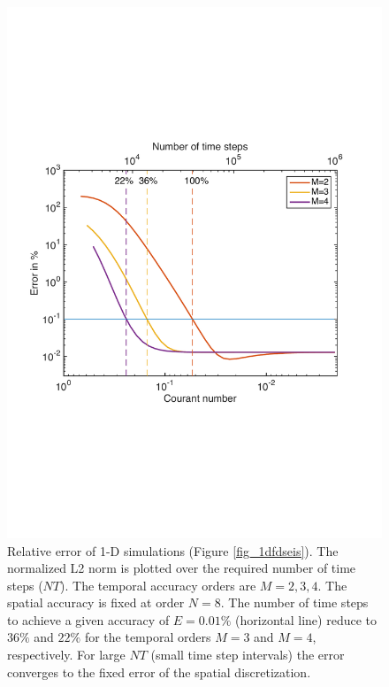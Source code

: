 \documentclass[11pt,onecolumn,oneside]{article}
\begin{document}
\begin{figure}[h]
\begin{center}
\includegraphics[scale=0.7]{eps/error_1D_courant}
\caption{Relative error of 1-D simulations (Figure \ref{fig_1dfdseis}). 
The normalized L2 norm is plotted over the required number of time steps ($NT$). The temporal accuracy orders are $M=2,3,4$. The spatial accuracy is fixed at order $N=8$. 
The number of time steps to achieve a given accuracy of $E=0.01\%$ (horizontal line) reduce to $36\%$ and $22\%$ for the temporal orders $M=3$ and $M=4$, respectively. 
For large $NT$ (small time step intervals) the error converges to the fixed error of the spatial discretization. }
\label{fig_L2}
\end{center}
\end{figure}
\newpage
\end{document}
